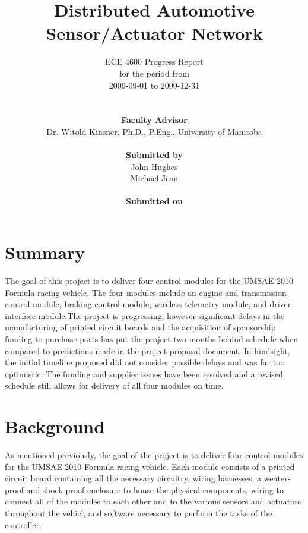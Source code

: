 \documentclass[12pt]{report}
\begin{document}
\title{Distributed Automotive Sensor/Actuator Network}
\author{
	\hline
	ECE 4600 Progress Report\\
	for the period from
	\\2009-09-01 to 2009-12-31\\
	\hline
	\\ \\
	\textbf{Faculty Advisor}\\
	Dr. Witold Kinsner, Ph.D., P.Eng., University of Manitoba\\
	\\
	\textbf{Submitted by}\\
	John Hughes\\
	Michael Jean
	\\ \\
	\textbf{Submitted on}
	\vspace{-1em}
}
\maketitle

\section{Summary}

The goal of this project is to deliver four control modules for the UMSAE 2010 Formula racing vehicle. The four modules include an engine and transmission control module, braking control module, wireless telemetry module, and driver interface module.The project is progressing, however significant delays in the manufacturing of printed circuit boards and the acquisition of sponsorship funding to purchase parts has put the project two months behind schedule when compared to predictions made in the project proposal document. In hindsight, the initial timeline proposed did not consider possible delays and was far too optimistic. The funding and supplier issues have been resolved and a revised schedule still allows for delivery of all four modules on time. 

\pagebreak

\section{Background}

As mentioned previously, the goal of the project is to deliver four control modules for the UMSAE 2010 Formula racing vehicle. Each module consists of a printed circuit board containing all the necessary circuitry, wiring harnesses, a weater-proof and shock-proof enclosure to house the physical components, wiring to connect all of the modules to each other and to the various sensors and actuators throughout the vehicl, and software necessary to perform the tasks of the controller.
\end{document}

